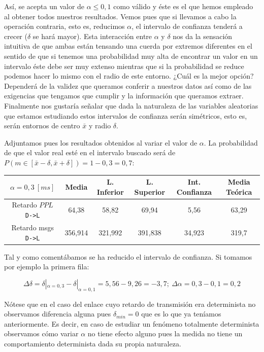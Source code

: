 \documentclass{article}[10pt]
\begin{document}
		Así, se acepta un valor de $\alpha \leq 0,1$ como válido y éste es el que hemos empleado al obtener todos nuestros resultados. Vemos pues que si llevamos a cabo la operación contraria, esto es, reducimos $\alpha$, el intervalo de confianza tenderá a crecer ($\delta$ se hará mayor). Esta interacción entre $\alpha$ y $\delta$ nos da la sensación intuitiva de que ambas están tensando una cuerda por extremos diferentes en el sentido de que si tenemos una probabilidad muy alta de encontrar un valor en un intervalo éste debe ser muy extenso mientras que si la probabilidad se reduce podemos hacer lo mismo con el radio de este entorno. ¿Cuál es la mejor opción? Dependerá de la validez que queramos conferir a nuestros datos así como de las exigencias que tengamos que cumplir y la información que queramos extraer. Finalmente nos gustaría señalar que dada la naturaleza de las variables aleatorias que estamos estudiando estos intervalos de confianza serán simétricos, esto es, serán entornos de centro $\bar{x}$ y radio $\delta$.

		Adjuntamos pues los resultados obtenidos al variar el valor de $\alpha$. La probabilidad de que el valor real esté en el intervalo buscado será de $P(m \in [\bar{x} - \delta, \bar{x} + \delta]) = 1 - 0,3 = 0,7$:

		\vskip 3mm

		\begin{center}
			\begin{tabular}{| c | c | c | c | c | c |}
				\hline
				$\alpha = 0,3\ [ms]$ & Media & L. Inferior & L. Superior & Int. Confianza & Media Teórica\\
				\hline
				Retardo $PPL$ \texttt{D->L} & 64,38 & 58,82 & 69,94 & 5,56 & 63,29\\
				\hline
				Retardo msgs \texttt{D->L} & 356,914 & 321,992 & 391,838 & 34,923 & 319,7\\
				\hline
			\end{tabular}
		\end{center}

		\vskip 3mm

		Tal y como comentábamos se ha reducido el intervalo de confianza. Si tomamos por ejemplo la primera fila:

		$$\Delta\delta = \delta|_{\alpha = 0,3} - \delta|_{\alpha = 0,1} = 5,56 - 9,26 = -3,7;\ \Delta\alpha = 0,3 - 0,1 = 0,2$$

		Nótese que en el caso del enlace cuyo retardo de transmisión era determinista no observamos diferencia alguna pues $\delta_{min} = 0$ que es lo que ya teníamos anteriormente. Es decir, en caso de estudiar un fenómeno totalmente determinista observamos cómo variar $\alpha$ no tiene efecto alguno pues la medida no tiene un comportamiento determinista dada su propia naturaleza.
\end{document}
